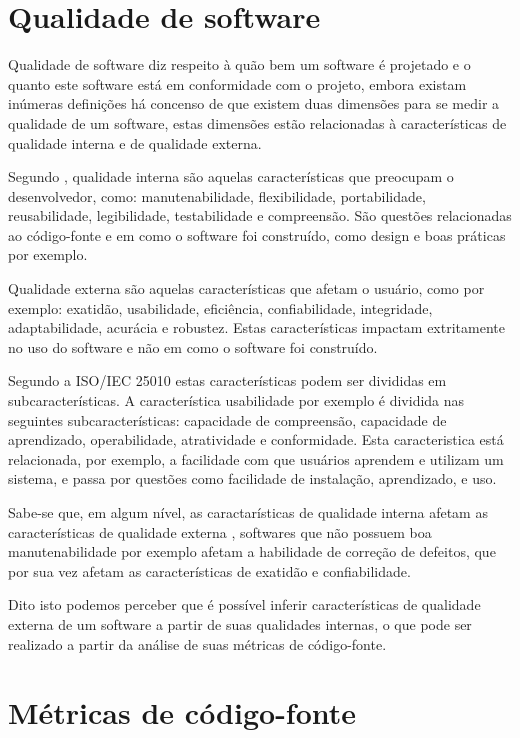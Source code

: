 \documentclass[qual, classic, a4paper]{ufbathesis}
\begin{document}
\section{Qualidade de software}

Qualidade de software diz respeito à quão bem um software é projetado e o
quanto este software está em conformidade com o projeto, embora existam
inúmeras definições há concenso de que existem duas dimensões para se medir a
qualidade de um software, estas dimensões estão relacionadas à características
de qualidade interna e de qualidade externa.

Segundo , qualidade interna são aquelas
características que preocupam o desenvolvedor, como: manutenabilidade,
flexibilidade, portabilidade, reusabilidade, legibilidade, testabilidade e
compreensão. São questões relacionadas ao código-fonte e em como o software
foi construído, como design e boas práticas por exemplo.

Qualidade externa são aquelas características que afetam o usuário, como por
exemplo: exatidão, usabilidade, eficiência, confiabilidade, integridade,
adaptabilidade, acurácia e robustez. Estas características impactam
extritamente no uso do software e não em como o software foi construído.

Segundo a ISO/IEC 25010 \cite{iso2011iec25010} estas características podem ser
divididas em subcaracterísticas. A característica usabilidade por exemplo é
dividida nas seguintes subcaracterísticas: capacidade de compreensão,
capacidade de aprendizado, operabilidade, atratividade e conformidade. Esta
caracteristica está relacionada, por exemplo, a facilidade com que usuários aprendem e
utilizam um sistema, e passa por questões como facilidade de instalação,
aprendizado, e uso.

Sabe-se que, em algum nível, as caractarísticas de qualidade interna afetam as
características de qualidade externa \cite{McConnell2004}, softwares que não
possuem boa manutenabilidade por exemplo afetam a habilidade de correção de
defeitos, que por sua vez afetam as características de exatidão e
confiabilidade.

Dito isto podemos perceber que é possível inferir características de qualidade
externa de um software a partir de suas qualidades internas, o que pode ser
realizado a partir da análise de suas métricas de código-fonte.

\section{Métricas de código-fonte}
\end{document}
